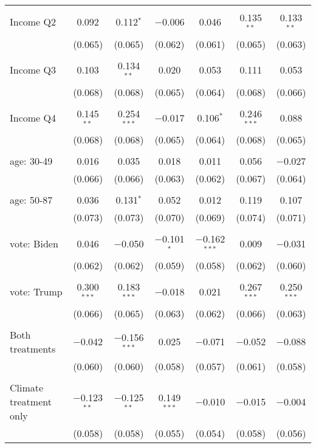 \begin{tabular}{@{\extracolsep{5pt}}lcccccc}
  & & & & & & \\ 
 Income Q2 & 0.092 & 0.112$^{*}$ & $-$0.006 & 0.046 & 0.135$^{**}$ & 0.133$^{**}$ \\ 
  & (0.065) & (0.065) & (0.062) & (0.061) & (0.065) & (0.063) \\ 
  & & & & & & \\ 
 Income Q3 & 0.103 & 0.134$^{**}$ & 0.020 & 0.053 & 0.111 & 0.053 \\ 
  & (0.068) & (0.068) & (0.065) & (0.064) & (0.068) & (0.066) \\ 
  & & & & & & \\ 
 Income Q4 & 0.145$^{**}$ & 0.254$^{***}$ & $-$0.017 & 0.106$^{*}$ & 0.246$^{***}$ & 0.088 \\ 
  & (0.068) & (0.068) & (0.065) & (0.064) & (0.068) & (0.065) \\ 
  & & & & & & \\ 
 age: 30-49 & 0.016 & 0.035 & 0.018 & 0.011 & 0.056 & $-$0.027 \\ 
  & (0.066) & (0.066) & (0.063) & (0.062) & (0.067) & (0.064) \\ 
  & & & & & & \\ 
 age: 50-87 & 0.036 & 0.131$^{*}$ & 0.052 & 0.012 & 0.119 & 0.107 \\ 
  & (0.073) & (0.073) & (0.070) & (0.069) & (0.074) & (0.071) \\ 
  & & & & & & \\ 
 vote: Biden & 0.046 & $-$0.050 & $-$0.101$^{*}$ & $-$0.162$^{***}$ & 0.009 & $-$0.031 \\ 
  & (0.062) & (0.062) & (0.059) & (0.058) & (0.062) & (0.060) \\ 
  & & & & & & \\ 
 vote: Trump & 0.300$^{***}$ & 0.183$^{***}$ & $-$0.018 & 0.021 & 0.267$^{***}$ & 0.250$^{***}$ \\ 
  & (0.066) & (0.065) & (0.063) & (0.062) & (0.066) & (0.063) \\ 
  & & & & & & \\ 
 Both treatments & $-$0.042 & $-$0.156$^{***}$ & 0.025 & $-$0.071 & $-$0.052 & $-$0.088 \\ 
  & (0.060) & (0.060) & (0.058) & (0.057) & (0.061) & (0.058) \\ 
  & & & & & & \\ 
 Climate treatment only & $-$0.123$^{**}$ & $-$0.125$^{**}$ & 0.149$^{***}$ & $-$0.010 & $-$0.015 & $-$0.004 \\ 
  & (0.058) & (0.058) & (0.055) & (0.054) & (0.058) & (0.056) \\ 

\end{tabular}
